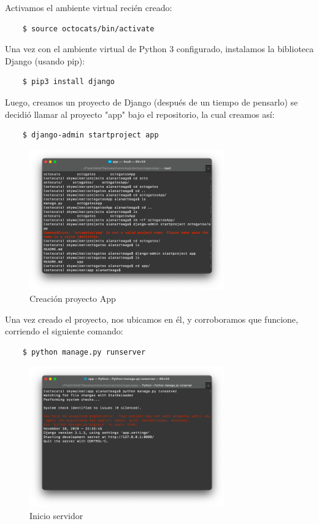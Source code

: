 \documentclass{article}
\begin{document}
\begin{enumerate}
    Activamos el ambiente virtual recién creado:
    \begin{lstlisting}
    $ source octocats/bin/activate
    \end{lstlisting}

    Una vez con el ambiente virtual de Python 3 configurado, instalamos la
    biblioteca Django (usando pip):
    \begin{lstlisting}
    $ pip3 install django
    \end{lstlisting}

    Luego, creamos un proyecto de Django (después de un tiempo de pensarlo) se
    decidió llamar al proyecto "app" bajo el repositorio, la cual creamos así:
    \begin{lstlisting}
    $ django-admin startproject app
    \end{lstlisting}

    \begin{figure}[H]
      \centering
      \includegraphics[width=0.75\textwidth]{AppServer/f2}
      \caption{Creación proyecto App}
    \end{figure}

    Una vez creado el proyecto, nos ubicamos en él, y corroboramos que funcione,
    corriendo el siguiente comando:
    \begin{lstlisting}
    $ python manage.py runserver
    \end{lstlisting}

    \begin{figure}[H]
      \centering
      \includegraphics[width=0.75\textwidth]{AppServer/f3}
      \caption{Inicio servidor}
    \end{figure}


\end{enumerate}
\end{document}
